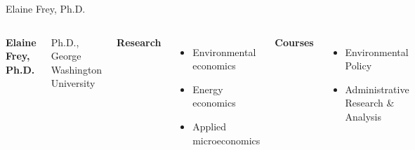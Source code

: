 \documentclass[10pt]{beamer}
\newlength{\imageheight}
\begin{document}
\begin{frame}{Elaine Frey, Ph.D.}
\begin{columns}[T,onlytextwidth]
    \raggedright
    {\large\bfseries Elaine Frey, Ph.D.}\par
    {\footnotesize Ph.D., George Washington University}\par\vspace{0.4em}

    \textbf{Research}
    \begin{itemize}
      \item Environmental economics
      \item Energy economics
      \item Applied microeconomics
    \end{itemize}

    \textbf{Courses}
    \begin{itemize}
      \item Environmental Policy
      \item Administrative Research \& Analysis
    \end{itemize}

    \vspace*{0.25cm}
    \includegraphics[height=\imageheight]{images/frey.jpg}
\end{columns}
\end{frame}
\end{document}
